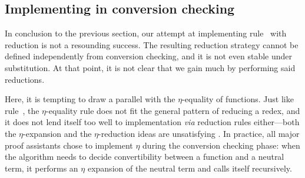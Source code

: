 \subsection{Implementing  in conversion checking}

In conclusion to the previous section, our attempt at implementing 
rule~ with reduction is not a resounding 
success.
% 
The resulting reduction strategy cannot be defined independently from 
conversion checking, and it is not even stable under substitution.
% 
At that point, it is not clear that we gain much by performing said reductions.

Here, it is tempting to draw a parallel with the \( \eta \)-equality of functions. 
% 
Just like rule~, the \( \eta \)-equality rule 
does not fit the general pattern of reducing a redex, and it does not lend 
itself too well to implementation \textit{via} reduction rules either---both the
\( \eta \)-expansion and the \( \eta \)-reduction ideas are unsatisfying
.
% 
In practice, all major proof assistants chose to implement \( \eta \) during 
the conversion checking phase: when the algorithm needs to decide 
convertibility between a function and a neutral term, it performs an \( \eta \)
expansion of the neutral term and calls itself recursively.

